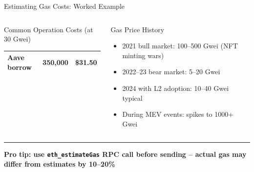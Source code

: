 \documentclass[8pt,aspectratio=169]{beamer}
\newcommand{\bottomnote}[1]{\vfill\vspace{-2mm}\textcolor{mllavender2}{\rule{\textwidth}{0.4pt}}\vspace{1mm}\footnotesize\textbf{#1}}
\begin{document}
\begin{frame}{Estimating Gas Costs: Worked Example}
\begin{columns}
\begin{block}{Common Operation Costs (at 30 Gwei)}
\begin{tabular}{@{}lrr@{}}
Aave borrow & 350,000 & \$31.50 \\
\bottomrule
\end{tabular}
\end{block}
\vspace{2mm}
\begin{block}{Gas Price History}
\begin{itemize}\small
  \item 2021 bull market: 100--500 Gwei (NFT minting wars)
  \item 2022--23 bear market: 5--20 Gwei
  \item 2024 with L2 adoption: 10--40 Gwei typical
  \item During MEV events: spikes to 1000+ Gwei
\end{itemize}
\end{block}
\end{columns}
\bottomnote{Pro tip: use \texttt{eth\_estimateGas} RPC call before sending -- actual gas may differ from estimates by 10--20\%}
\end{frame}
\end{document}
